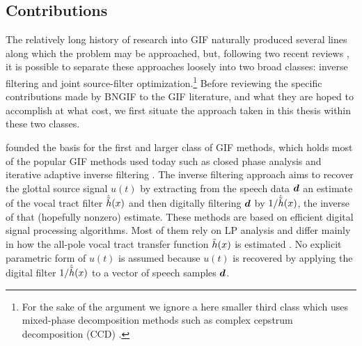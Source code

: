 \begin{chaptersections}

\section{Contributions}

The relatively long history
of research into GIF naturally produced several lines along which the problem may be approached, but, following two recent reviews \citep{Kadiri2021,Drugman2019a}, it is possible to separate these approaches loosely into two broad classes: inverse filtering and joint source-filter optimization.\footnote{%
For the sake of the argument we ignore a here smaller third class which uses mixed-phase decomposition methods \citep{Degottex2010,Kadiri2021,Drugman2019a} such as complex cepstrum decomposition (CCD) \citep{Drugman2011}.
}
Before reviewing the specific contributions made by BNGIF to the GIF literature, and what they are hoped to accomplish at what cost, we first situate the approach taken in this thesis within these two classes.


\cite{Miller1959} founded the basis for the first and larger class of GIF methods, which holds most of the popular GIF methods used today such as closed phase analysis \citep[CP;][]{Wong1979} and iterative adaptive inverse filtering \citep[IAIF;][]{Alku1992}.
The inverse filtering approach aims to recover the glottal source signal $u(t)$ by extracting from the speech data ${\bm d}$ an estimate of the vocal tract filter $\hat{\tilde{h}}(x)$ and then digitally filtering ${\bm d}$ by $1/\hat{\tilde{h}}(x)$, the inverse of that (hopefully nonzero) estimate.
These methods are based on efficient digital signal processing algorithms.
Most of them rely on LP analysis and differ mainly in how the all-pole vocal tract transfer function $\tilde{h}(x)$ is estimated \citep{Kadiri2021}.
No explicit parametric form of $u(t)$ is assumed because $u(t)$ is recovered by applying the digital filter $1/\hat{\tilde{h}}(x)$ to a vector of speech samples ${\bm d}$.


\end{chaptersections}
